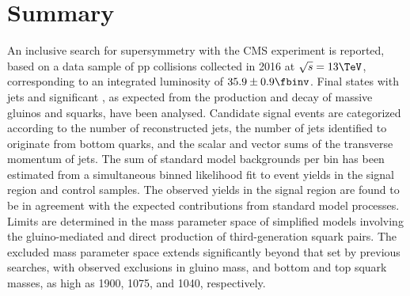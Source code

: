 
\clearpage
\section{Summary}
\label{sec:summary}

An inclusive search for supersymmetry with the CMS experiment is
reported, based on a data sample of pp collisions collected in 2016 at
$\sqrt{s} = 13\TeV$, corresponding to an integrated luminosity of
$35.9 \pm 0.9 \fbinv$. Final states with jets and significant
\ptvecmiss, as expected from the production and decay of massive
gluinos and squarks, have been analysed. Candidate signal events are
categorized according to the number of reconstructed jets, the number
of jets identified to originate from bottom quarks, and the scalar and
vector sums of the transverse momentum of jets. The sum of standard
model backgrounds per bin has been estimated from a simultaneous
binned likelihood fit to event yields in the signal region and control
samples. The observed yields in the signal region are found to be in
agreement with the expected contributions from standard model
processes. Limits are determined in the mass parameter space of
simplified models involving the gluino-mediated and direct production
of third-generation squark pairs. The excluded mass parameter space
extends significantly beyond that set by previous searches, with
observed exclusions in gluino mass, and bottom and top squark masses,
as high as 1900, 1075, and 1040\GeV, respectively.


\clearpage



\appendix


